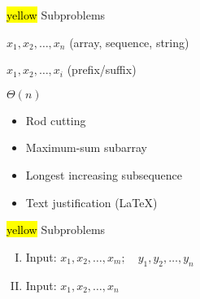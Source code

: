 \begin{frame}{}
  \centerline{\hl{yellow}{\Large {} Subproblems}}

  \vspace{0.50cm}
  \begin{description}[Subproblems:]
    \setlength{\itemsep}{8pt}
    \item[Input:] $x_1, x_2, \dots, x_n$ (array, sequence, string)
    \item[Subproblems:] $x_1, x_2, \dots, x_i$ (prefix/suffix)
    \item[\#:] $\Theta(n)$
    \item[Examples:] 
      \begin{itemize}
	\setlength{\itemsep}{4pt}
	\item Rod cutting
	\item Maximum-sum subarray
	\item Longest increasing subsequence
	\item Text justification (\LaTeX)
      \end{itemize}
  \end{description}
\end{frame}
\begin{frame}{}
  \centerline{\hl{yellow}{\Large {} Subproblems}}

  \vspace{0.50cm}
  \begin{enumerate}[(I)]
    \item Input: $x_{1}, x_{2}, \dots, x_{m}; \quad y_{1}, y_{2}, \dots, y_{n}$ 
      \vspace{3pt}
    \pause
    \vspace{10pt}
    \item Input: $x_{1}, x_{2}, \dots, x_{n}$
      \vspace{3pt}
  \end{enumerate}
\end{frame}


